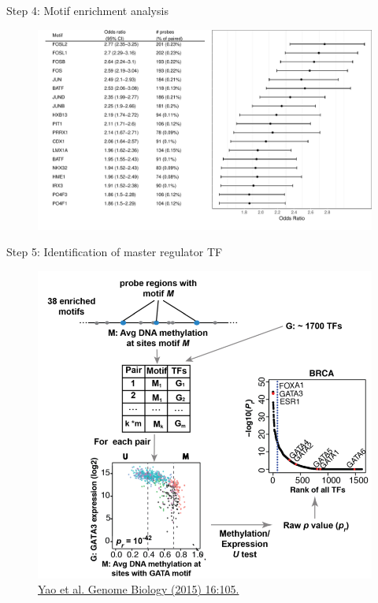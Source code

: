 \documentclass[slidestop,compress,11pt,xcolor=dvipsnames]{beamer}
\begin{document}
\begin{frame}{Step 4: Motif enrichment analysis}
 \begin{figure}
  \centering
  \includegraphics[width=1.0\linewidth]{ELMER/motif_enrichment.pdf}
 \end{figure}
\end{frame}




\begin{frame}{Step 5: Identification of master regulator TF}
\vspace*{-0.5cm}
 \begin{figure}
  \centering
  \includegraphics[width=0.7\linewidth]{ELMER/tfrank.png}{\tiny{\\\href{https://genomebiology.biomedcentral.com/articles/10.1186/s13059-015-0668-3}{Yao et al. Genome Biology (2015) 16:105.}}}
 \end{figure}
\end{frame}
\end{document}

